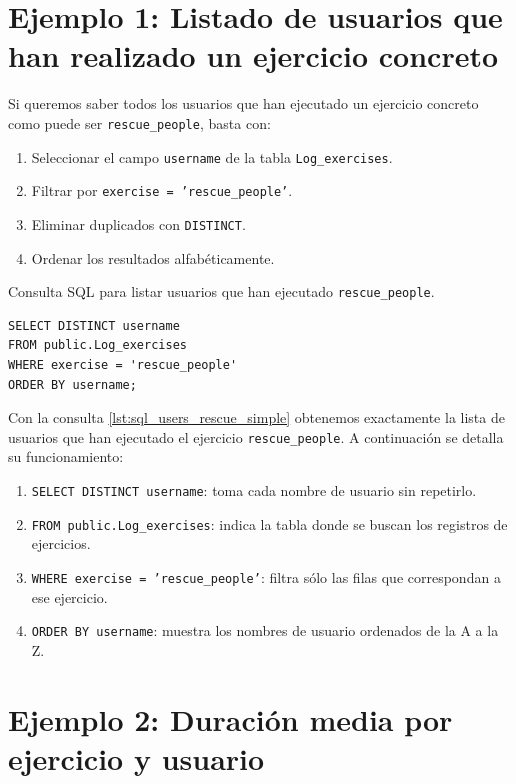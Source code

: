 \documentclass[a4paper, 12pt]{book}
\begin{document}
\section{Ejemplo 1: Listado de usuarios que han realizado un ejercicio concreto}

Si queremos saber todos los usuarios que han ejecutado un ejercicio concreto como puede ser \texttt{rescue\_people}, basta con:

\begin{enumerate}
    \item Seleccionar el campo \texttt{username} de la tabla \texttt{Log\_exercises}.
    \item Filtrar por \texttt{exercise = 'rescue\_people'}.
    \item Eliminar duplicados con \texttt{DISTINCT}.
    \item Ordenar los resultados alfabéticamente.
\end{enumerate}

\begin{listing}[h!]
\caption{Consulta SQL para listar usuarios que han ejecutado \texttt{rescue\_people}.}{}
\label{lst:sql_users_rescue_simple}
\begin{verbatim}
SELECT DISTINCT username
FROM public.Log_exercises
WHERE exercise = 'rescue_people'
ORDER BY username;
\end{verbatim}
\end{listing}

Con la consulta \ref{lst:sql_users_rescue_simple} obtenemos exactamente la lista de usuarios que han ejecutado el ejercicio \texttt{rescue\_people}. A continuación se detalla su funcionamiento:

\begin{enumerate}
    \item \texttt{SELECT DISTINCT username}: toma cada nombre de usuario sin repetirlo.
    \item \texttt{FROM public.Log\_exercises}: indica la tabla donde se buscan los registros de ejercicios.
    \item \texttt{WHERE exercise = 'rescue\_people'}: filtra sólo las filas que correspondan a ese ejercicio.
    \item \texttt{ORDER BY username}: muestra los nombres de usuario ordenados de la A a la Z.
\end{enumerate}

\section{Ejemplo 2: Duración media por ejercicio y usuario}
\end{document}
